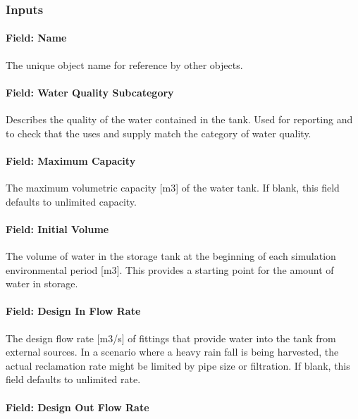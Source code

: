 \subsubsection{Inputs}\label{inputs-2-046}

\paragraph{Field: Name}\label{field-name-2-043}

The unique object name for reference by other objects.

\paragraph{Field: Water Quality Subcategory}\label{field-water-quality-subcategory}

Describes the quality of the water contained in the tank. Used for reporting and to check that the uses and supply match the category of water quality.

\paragraph{Field: Maximum Capacity}\label{field-maximum-capacity}

The maximum volumetric capacity {[}m3{]} of the water tank. If blank, this field defaults to unlimited capacity.

\paragraph{Field: Initial Volume}\label{field-initial-volume}

The volume of water in the storage tank at the beginning of each simulation environmental period {[}m3{]}. This provides a starting point for the amount of water in storage.

\paragraph{Field: Design In Flow Rate}\label{field-design-in-flow-rate}

The design flow rate {[}m3/s{]} of fittings that provide water into the tank from external sources. In a scenario where a heavy rain fall is being harvested, the actual reclamation rate might be limited by pipe size or filtration. If blank, this field defaults to unlimited rate.

\paragraph{Field: Design Out Flow Rate}\label{field-design-out-flow-rate}


